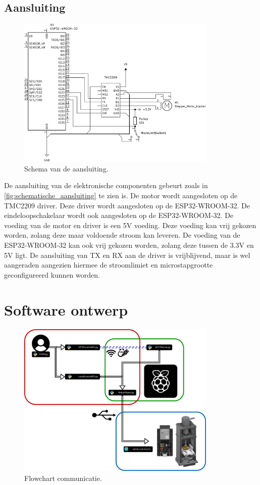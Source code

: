 \subsection{Aansluiting}
\begin{figure}[H]
    \centering
    \includegraphics[width=0.85\textwidth]{figures/Wiring_BW.png}
    \caption{Schema van de aansluiting.}\label{fig:schematische_aansluiting}
\end{figure}
De aansluiting van de elektronische componenten gebeurt zoals in \autoref{fig:schematische_aansluiting} te zien is. De motor wordt aangesloten op de TMC2209 driver. Deze driver wordt aangesloten op de ESP32-WROOM-32. De eindeloopschakelaar wordt ook aangesloten op de ESP32-WROOM-32. De voeding van de motor en driver is een 5V voeding. Deze voeding kan vrij gekozen worden, zolang deze maar voldoende stroom kan leveren. De voeding van de ESP32-WROOM-32 kan ook vrij gekozen worden, zolang deze tussen de 3.3V en 5V ligt. De aansluiting van TX en RX aan de driver is vrijblijvend, maar is wel aangeraden aangezien hiermee de stroomlimiet en microstapgrootte geconfigureerd kunnen worden.

\section{Software ontwerp}
\begin{figure}[H]
    \centering
    \includegraphics[width=0.85\textwidth]{figures/Flowchart.png}
    \caption{Flowchart communicatie.}\label{fig:Flowchart}
\end{figure}

